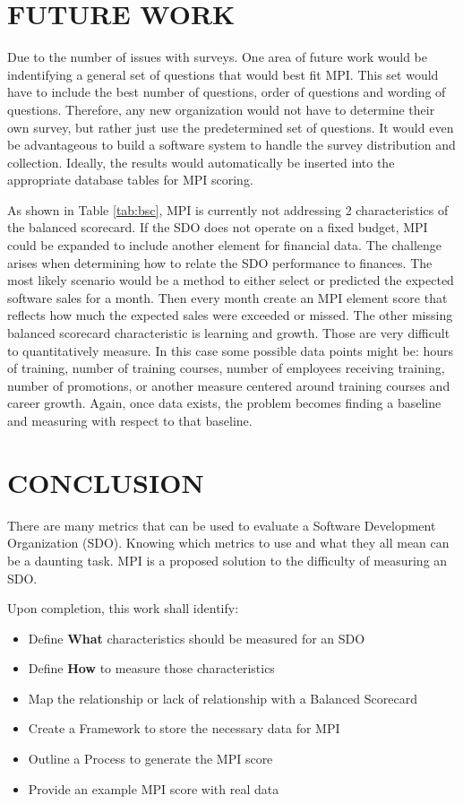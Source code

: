 \documentclass[SDSUThesis.tex]{subfiles}
\begin{document}
\section{FUTURE WORK}

Due to the number of issues with surveys.  One area of future work would be indentifying
a general set of questions that would best fit MPI.  This set would have to include
the best number of questions, order of questions and wording of questions.  Therefore,
any new organization would not have to determine their own survey, but rather just use the
predetermined set of questions.  It would even be advantageous to build a software system to
handle the survey distribution and collection.  Ideally, the results would automatically be
inserted into the appropriate database tables for MPI scoring. 

As shown in Table \ref{tab:bsc}, MPI is currently not addressing 2 characteristics of the balanced scorecard.  If the SDO does not operate on a fixed budget, MPI could be 
expanded to include another element for financial data. The challenge arises when
determining how to relate the SDO performance to finances.  The most likely scenario
would be a method to either select or predicted the expected software sales
for a month.  Then every month create an MPI element score that reflects
how much the expected sales were exceeded or missed.  The other missing
balanced scorecard characteristic is learning and growth.  Those are very difficult
to quantitatively measure.  In this case some possible data points might be:
hours of training, number of training courses, number of employees receiving
training, number of promotions, or another measure centered around training
courses and career growth.  Again, once data exists, the problem becomes finding
a baseline and measuring with respect to that baseline.

\section{CONCLUSION}

There are many metrics that can be used to evaluate a Software Development Organization (SDO). 
Knowing which metrics to use and what they all mean can be a daunting task.  MPI is a
proposed solution to the difficulty of measuring an SDO.

Upon completion, this work shall identify:
\begin{itemize}
    \item Define \textbf{What} characteristics should be measured for an SDO
    \item Define \textbf{How} to measure those characteristics
    \item Map the relationship or lack of relationship with a Balanced Scorecard
    \item Create a Framework to store the necessary data for MPI
    \item Outline a Process to generate the MPI score
    \item Provide an example MPI score with real data
\end{itemize}
\end{document}
